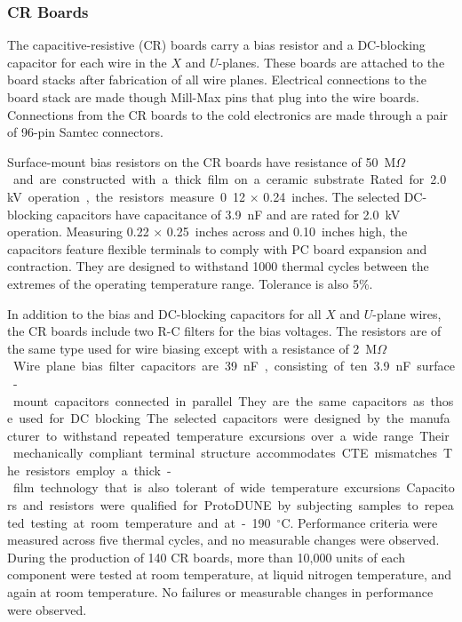 \subsubsection{CR Boards}
\label{sec:crboards}

The capacitive-resistive (CR) boards carry a bias resistor and a DC-blocking capacitor for each wire in the $X$ and $U$-planes. These boards are attached to the board stacks after fabrication of all wire planes.   Electrical connections to the board stack are made though Mill-Max pins that plug into the wire boards. Connections from the CR boards to the cold electronics are made through a pair of 96-pin Samtec connectors.

Surface-mount bias resistors on the CR boards have resistance of \SI{50}{M$\Omega$} and are constructed with a thick film on a ceramic substrate. Rated for \SI{2.0}{kV} operation, the resistors measure 0.12 $\times$ \SI{0.24}{inches}. The selected DC-blocking capacitors have capacitance of \SI{3.9}{nF} and are rated for \SI{2.0}{kV} operation. Measuring 0.22 $\times$ \SI{0.25}{inches} across and \SI{0.10}{inches} high, the capacitors feature flexible terminals to comply with PC board expansion and contraction. They are designed to withstand 1000 thermal cycles between the extremes of the operating temperature range. Tolerance is also 5\%.

In addition to the bias and DC-blocking capacitors for all $X$ and $U$-plane wires, the CR boards include two R-C filters for the bias voltages. The resistors are of the same type used for wire biasing except with a resistance of \SI{2}{M$\Omega$}. Wire plane bias filter capacitors are \SI{39}{nF}, consisting of ten \SI{3.9}{nF} surface-mount capacitors connected in parallel. They are the same capacitors as those used for DC blocking.

The selected capacitors were designed by the manufacturer to withstand repeated temperature excursions over a wide range. Their mechanically compliant terminal structure accommodates CTE mismatches. The resistors employ a thick-film technology that is also tolerant of wide temperature excursions.  Capacitors and resistors were qualified for ProtoDUNE by subjecting samples to repeated testing at room temperature and at -190~$^\circ$C.  Performance criteria were measured across five thermal cycles, and no measurable changes were observed. During the production of 140 CR boards, more than 10,000 units of each component were tested at room temperature, at liquid nitrogen temperature, and again at room temperature. No failures or measurable changes in performance were observed.



